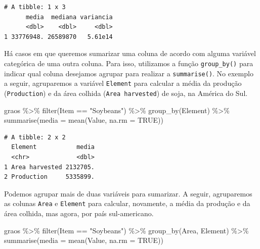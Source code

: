 \documentclass[
  brazilian,
]{book}
\newenvironment{Shaded}{\begin{snugshade}}{\end{snugshade}}
\newcommand{\AttributeTok}[1]{\textcolor[rgb]{0.77,0.63,0.00}{#1}}
\newcommand{\ConstantTok}[1]{\textcolor[rgb]{0.00,0.00,0.00}{#1}}
\newcommand{\FunctionTok}[1]{\textcolor[rgb]{0.00,0.00,0.00}{#1}}
\newcommand{\NormalTok}[1]{#1}
\newcommand{\SpecialCharTok}[1]{\textcolor[rgb]{0.00,0.00,0.00}{#1}}
\newcommand{\StringTok}[1]{\textcolor[rgb]{0.31,0.60,0.02}{#1}}
\begin{document}
\begin{verbatim}
# A tibble: 1 x 3
      media  mediana variancia
      <dbl>    <dbl>     <dbl>
1 33776948. 26589870   5.61e14
\end{verbatim}

Há casos em que queremos sumarizar uma coluna de acordo com alguma variável categórica de uma outra coluna. Para isso, utilizamos a função \texttt{group\_by()} para indicar qual coluna desejamos agrupar para realizar a \texttt{summarise()}. No exemplo a seguir, agruparemos a variável \texttt{Element} para calcular a média da produção (\texttt{Production}) e da área colhida (\texttt{Area\ harvested}) de soja, na América do Sul.

\begin{Shaded}
\begin{Highlighting}[]
\NormalTok{graos }\SpecialCharTok{\%\textgreater{}\%} 
  \FunctionTok{filter}\NormalTok{(Item }\SpecialCharTok{==} \StringTok{"Soybeans"}\NormalTok{) }\SpecialCharTok{\%\textgreater{}\%} 
  \FunctionTok{group\_by}\NormalTok{(Element) }\SpecialCharTok{\%\textgreater{}\%} 
  \FunctionTok{summarise}\NormalTok{(}\AttributeTok{media =} \FunctionTok{mean}\NormalTok{(Value, }\AttributeTok{na.rm =} \ConstantTok{TRUE}\NormalTok{))}
\end{Highlighting}
\end{Shaded}

\begin{verbatim}
# A tibble: 2 x 2
  Element           media
  <chr>             <dbl>
1 Area harvested 2132705.
2 Production     5335899.
\end{verbatim}

Podemos agrupar mais de duas variáveis para sumarizar. A seguir, agruparemos as colunas \texttt{Area} e \texttt{Element} para calcular, novamente, a média da produção e da área colhida, mas agora, por país sul-americano.

\begin{Shaded}
\begin{Highlighting}[]
\NormalTok{graos }\SpecialCharTok{\%\textgreater{}\%} 
  \FunctionTok{filter}\NormalTok{(Item }\SpecialCharTok{==} \StringTok{"Soybeans"}\NormalTok{) }\SpecialCharTok{\%\textgreater{}\%}
  \FunctionTok{group\_by}\NormalTok{(Area, Element) }\SpecialCharTok{\%\textgreater{}\%} 
  \FunctionTok{summarise}\NormalTok{(}\AttributeTok{media =} \FunctionTok{mean}\NormalTok{(Value, }\AttributeTok{na.rm =} \ConstantTok{TRUE}\NormalTok{))}
\end{Highlighting}
\end{Shaded}
\end{document}
